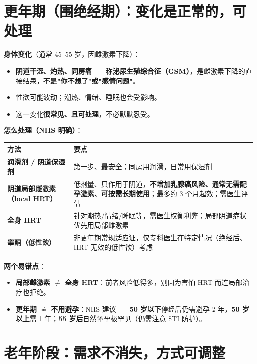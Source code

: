 \section{更年期（围绝经期）：变化是正常的，可处理}

\textbf{身体变化}（通常 45--55 岁，因雌激素下降）：

\begin{itemize}[leftmargin=2em,itemsep=0.3em]
  \item \textbf{阴道干涩、灼热、同房痛}——称\textbf{泌尿生殖综合征（GSM）}，是雌激素下降的直接结果，\textbf{不是"你不想了"或"感情问题"}。
  \item 性欲可能波动；潮热、情绪、睡眠也会受影响。
  \item 这一变化\textbf{很常见、且可处理}，不必默默忍受。
\end{itemize}

\textbf{怎么处理（NHS 明确）}：

\begin{tabularx}{\linewidth}{X X}
\toprule
\textbf{方法} & \textbf{要点} \\
\midrule
\textbf{润滑剂 / 阴道保湿剂} & 第一步、最安全；同房用润滑，日常用保湿剂 \\
\textbf{阴道局部雌激素（local HRT）} & 低剂量、只作用于阴道，\textbf{不增加乳腺癌风险、通常无需配孕激素、可按需长期使用}；最多约 3 个月起效；需医生评估 \\
\textbf{全身 HRT} & 针对潮热/情绪/睡眠等，需医生权衡利弊；局部阴道症状优先用局部雌激素 \\
\textbf{睾酮（低性欲）} & 非更年期常规适应证，仅专科医生在特定情况（绝经后、HRT 无效的低性欲）考虑 \\
\bottomrule
\end{tabularx}

\vspace{0.5em}
\textbf{两个易错点}：

\begin{itemize}[leftmargin=2em,itemsep=0.3em]
  \item \textbf{局部雌激素 $\ne$ 全身 HRT}：前者风险低得多，别因为害怕 HRT 而连局部治疗也拒绝。
  \item \textbf{更年期 $\ne$ 不用避孕}：NHS 建议——\textbf{50 岁以下}停经后仍需避孕 2 年，\textbf{50 岁以上}需 1 年；\textbf{55 岁后}自然怀孕极罕见（仍需注意 STI 防护）。
\end{itemize}

\section{老年阶段：需求不消失，方式可调整}

